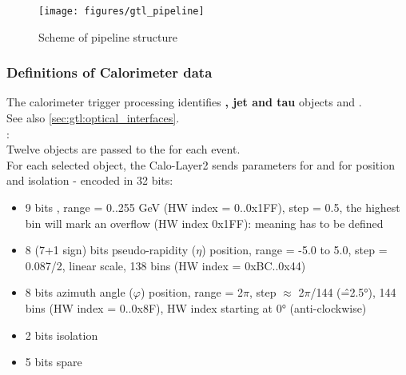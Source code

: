 \begin{figure}[htb]
\centering
\texttt{[image: figures/gtl\_pipeline]}
\caption{Scheme of \ugtl pipeline structure}
\label{fig:gtl:gtl_pipeline}
\end{figure}


\subsubsection{Definitions of Calorimeter data}
\label{sec:gtl:calorimeter_data}

The calorimeter trigger processing identifies \textbf{\egamma, jet and tau} objects and \textbf{\esums}.\\
See also \ref{sec:gtl:optical_interfaces}.\\

\textbf{\egamma}:\\ Twelve objects are passed to the \ugt for each event.\\
For each selected object, the Calo-Layer2 sends parameters for \pt and for position and isolation - encoded in 32 bits:
\begin{itemize}
\item 9 bits \pt, range = 0..255 GeV (HW index = 0..0x1FF), step = 0.5, the highest bin will mark an overflow (HW index 0x1FF): meaning has to be defined
\item 8 (7+1 sign) bits pseudo-rapidity ($\eta$) position, range = -5.0 to 5.0, step = 0.087/2, linear scale, 138 bins (HW index = 0xBC..0x44)
\item 8 bits azimuth angle ($\varphi$) position, range = 2$\pi$, step $\approx$ 2$\pi$/144 (\^=2.5°), 144 bins (HW index = 0..0x8F), HW index starting at 0° (anti-clockwise)
\item 2 bits isolation
\item 5 bits spare
\end{itemize}


